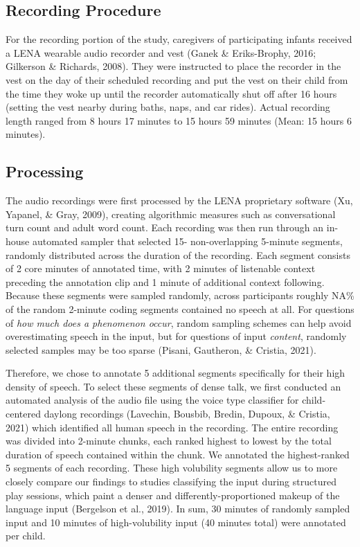 \documentclass[
  man]{apa6}
\begin{document}
\hypertarget{recording-procedure}{%
\subsection{Recording Procedure}\label{recording-procedure}}

For the recording portion of the study, caregivers of participating infants received a LENA wearable audio recorder and vest (Ganek \& Eriks-Brophy, 2016; Gilkerson \& Richards, 2008). They were instructed to place the recorder in the vest on the day of their scheduled recording and put the vest on their child from the time they woke up until the recorder automatically shut off after 16 hours (setting the vest nearby during baths, naps, and car rides). Actual recording length ranged from 8 hours 17 minutes to 15 hours 59 minutes (Mean: 15 hours 6 minutes).

\hypertarget{processing}{%
\subsection{Processing}\label{processing}}

The audio recordings were first processed by the LENA proprietary software (Xu, Yapanel, \& Gray, 2009), creating algorithmic measures such as conversational turn count and adult word count. Each recording was then run through an in-house automated sampler that selected 15- non-overlapping 5-minute segments, randomly distributed across the duration of the recording. Each segment consists of 2 core minutes of annotated time, with 2 minutes of listenable context preceding the annotation clip and 1 minute of additional context following. Because these segments were sampled randomly, across participants roughly NA\% of the random 2-minute coding segments contained no speech at all. For questions of \emph{how much does a phenomenon occur}, random sampling schemes can help avoid overestimating speech in the input, but for questions of input \emph{content}, randomly selected samples may be too sparse (Pisani, Gautheron, \& Cristia, 2021).

Therefore, we chose to annotate 5 additional segments specifically for their high density of speech. To select these segments of dense talk, we first conducted an automated analysis of the audio file using the voice type classifier for child-centered daylong recordings (Lavechin, Bousbib, Bredin, Dupoux, \& Cristia, 2021) which identified all human speech in the recording. The entire recording was divided into 2-minute chunks, each ranked highest to lowest by the total duration of speech contained within the chunk. We annotated the highest-ranked 5 segments of each recording. These high volubility segments allow us to more closely compare our findings to studies classifying the input during structured play sessions, which paint a denser and differently-proportioned makeup of the language input (Bergelson et al., 2019). In sum, 30 minutes of randomly sampled input and 10 minutes of high-volubility input (40 minutes total) were annotated per child.
\end{document}
